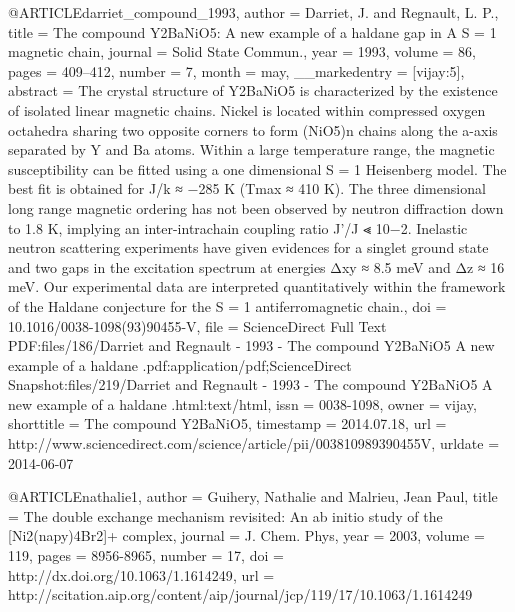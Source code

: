 @ARTICLE{darriet_compound_1993,
  author = {Darriet, J. and Regnault, L. P.},
  title = {The compound Y2BaNiO5: A new example of a haldane gap in A S = 1
	magnetic chain},
  journal = {Solid State Commun.},
  year = {1993},
  volume = {86},
  pages = {409--412},
  number = {7},
  month = may,
  __markedentry = {[vijay:5]},
  abstract = {The crystal structure of Y2BaNiO5 is characterized by the existence
	of isolated linear magnetic chains. Nickel is located within compressed
	oxygen octahedra sharing two opposite corners to form ({NiO}5)n chains
	along the a-axis separated by Y and Ba atoms. Within a large temperature
	range, the magnetic susceptibility can be fitted using a one dimensional
	S = 1 Heisenberg model. The best fit is obtained for J/k ≈ −285
	K (Tmax ≈ 410 K). The three dimensional long range magnetic ordering
	has not been observed by neutron diffraction down to 1.8 K, implying
	an inter-intrachain coupling ratio J'/J ⪡ 10−2. Inelastic neutron
	scattering experiments have given evidences for a singlet ground
	state and two gaps in the excitation spectrum at energies Δxy ≈
	8.5 {meV} and Δz ≈ 16 {meV}. Our experimental data are interpreted
	quantitatively within the framework of the Haldane conjecture for
	the S = 1 antiferromagnetic chain.},
  doi = {10.1016/0038-1098(93)90455-V},
  file = {ScienceDirect Full Text PDF:files/186/Darriet and Regnault - 1993 - The compound Y2BaNiO5 A new example of a haldane .pdf:application/pdf;ScienceDirect Snapshot:files/219/Darriet and Regnault - 1993 - The compound Y2BaNiO5 A new example of a haldane .html:text/html},
  issn = {0038-1098},
  owner = {vijay},
  shorttitle = {The compound Y2BaNiO5},
  timestamp = {2014.07.18},
  url = {http://www.sciencedirect.com/science/article/pii/003810989390455V},
  urldate = {2014-06-07}
}

@ARTICLE{nathalie1,
  author = {Guihery, Nathalie and Malrieu, Jean Paul},
  title = {The double exchange mechanism revisited: An ab initio study of the
	[Ni2(napy)4Br2]+ complex},
  journal = {J. Chem. Phys},
  year = {2003},
  volume = {119},
  pages = {8956-8965},
  number = {17},
  doi = {http://dx.doi.org/10.1063/1.1614249},
  url = {http://scitation.aip.org/content/aip/journal/jcp/119/17/10.1063/1.1614249}
}

